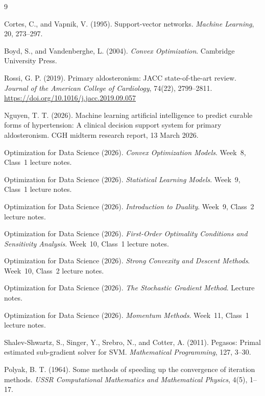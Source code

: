 \documentclass[11pt,a4paper]{article}
\numberwithin{equation}{section} %
\begin{document}
\begin{thebibliography}{9}

Cortes, C., and Vapnik, V. (1995).
Support-vector networks.
\textit{Machine Learning}, 20, 273--297.

Boyd, S., and Vandenberghe, L. (2004).
\textit{Convex Optimization}.
Cambridge University Press.

Rossi, G. P. (2019).
Primary aldosteronism: JACC state-of-the-art review.
\textit{Journal of the American College of Cardiology}, 74(22), 2799--2811.
\url{https://doi.org/10.1016/j.jacc.2019.09.057}

Nguyen, T. T. (2026).
Machine learning artificial intelligence to predict curable forms of hypertension:
A clinical decision support system for primary aldosteronism.
CGH midterm research report, 13 March 2026.

Optimization for Data Science (2026).
\textit{Convex Optimization Models}. Week~8, Class~1 lecture notes.

Optimization for Data Science (2026).
\textit{Statistical Learning Models}. Week~9, Class~1 lecture notes.

Optimization for Data Science (2026).
\textit{Introduction to Duality}. Week~9, Class~2 lecture notes.

Optimization for Data Science (2026).
\textit{First-Order Optimality Conditions and Sensitivity Analysis}.
Week~10, Class~1 lecture notes.

Optimization for Data Science (2026).
\textit{Strong Convexity and Descent Methods}. Week~10, Class~2 lecture notes.

Optimization for Data Science (2026).
\textit{The Stochastic Gradient Method}. Lecture notes.

Optimization for Data Science (2026).
\textit{Momentum Methods}. Week~11, Class~1 lecture notes.

Shalev-Shwartz, S., Singer, Y., Srebro, N., and Cotter, A. (2011).
Pegasos: Primal estimated sub-gradient solver for SVM.
\textit{Mathematical Programming}, 127, 3--30.

Polyak, B. T. (1964).
Some methods of speeding up the convergence of iteration methods.
\textit{USSR Computational Mathematics and Mathematical Physics}, 4(5), 1--17.


\end{thebibliography}
\end{document}
